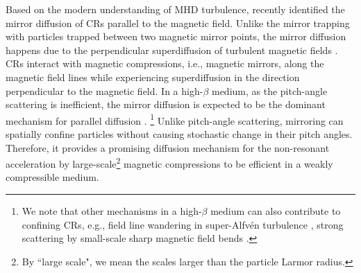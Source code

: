 \documentclass[preprint2,twocolumn,times,tighten]{aastex63}
\begin{document}
Based on the modern understanding of MHD turbulence, 
\citet{LXm21} recently identified the mirror diffusion of CRs parallel to the magnetic field. 
Unlike the mirror trapping 
with particles trapped between two magnetic mirror points, 
the mirror diffusion happens due to the perpendicular superdiffusion of turbulent magnetic fields 
\citep{LVC04,XY13,Bere13,Eyin13,LY14,Hucr22}.
CRs interact with magnetic compressions, i.e., magnetic mirrors, along the magnetic field lines
while experiencing superdiffusion in the direction perpendicular to the magnetic field. 
In a high-$\beta$ medium, as the pitch-angle scattering is inefficient, the mirror diffusion is expected to be the dominant mechanism for parallel diffusion
\citep{LXm21}.
\footnote{We note that other mechanisms in a high-$\beta$ medium can also contribute to confining CRs, e.g., field line wandering in super-Alfv\'{e}n turbulence 
\citep{Brunetti_Laz}, strong scattering by small-scale sharp magnetic field bends
\citep{Lemo23,Kemp23}.}
Unlike pitch-angle scattering, 
mirroring can spatially confine particles without causing stochastic change in their pitch angles. 
Therefore, it provides a promising diffusion mechanism for the non-resonant acceleration by large-scale\footnote{By ``large scale", we mean the scales larger than the particle Larmor radius.} magnetic compressions to be efficient in a weakly compressible medium. 






\end{document}
